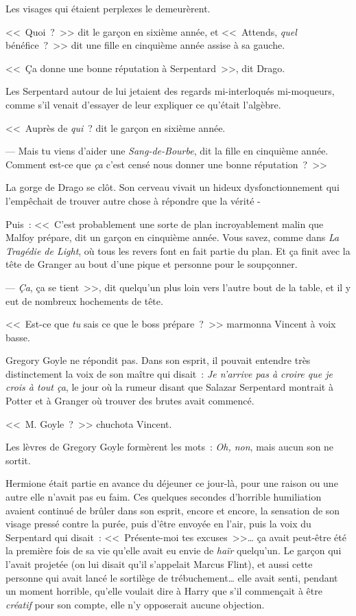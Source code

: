 Les visages qui étaient perplexes le demeurèrent.

<<~Quoi~?~>> dit le garçon en sixième année, et <<~Attends, \emph{quel} bénéfice~?~>> dit une fille en cinquième année assise à sa gauche.

<<~Ça donne une bonne réputation à Serpentard~>>, dit Drago.

Les Serpentard autour de lui jetaient des regards mi-interloqués mi-moqueurs, comme s'il venait d'essayer de leur expliquer ce qu'était l'algèbre.

<<~Auprès de \emph{qui}~? dit le garçon en sixième année.

--- Mais tu viens d'aider une \emph{Sang-de-Bourbe}, dit la fille en cinquième année. Comment est-ce que \emph{ça} c'est censé nous donner une bonne réputation~?~>>

La gorge de Drago se clôt. Son cerveau vivait un hideux dysfonctionnement qui l'empêchait de trouver autre chose à répondre que la vérité -

Puis~: <<~C'est probablement une sorte de plan incroyablement malin que Malfoy prépare, dit un garçon en cinquième année. Vous savez, comme dans \emph{La Tragédie de Light}, où tous les revers font en fait partie du plan. Et ça finit avec la tête de Granger au bout d'une pique et personne pour le soupçonner.

--- \emph{Ça}, ça se tient~>>, dit quelqu'un plus loin vers l'autre bout de la table, et il y eut de nombreux hochements de tête.

\later

<<~Est-ce que \emph{tu} sais ce que le boss prépare~?~>> marmonna Vincent à voix basse.

Gregory Goyle ne répondit pas. Dans son esprit, il pouvait entendre très distinctement la voix de son maître qui disait~: \emph{Je n'arrive pas à croire que je crois à tout ça}, le jour où la rumeur disant que Salazar Serpentard montrait à Potter et à Granger où trouver des brutes avait commencé.

<<~M. Goyle~?~>> chuchota Vincent.

Les lèvres de Gregory Goyle formèrent les mots~: \emph{Oh, non}, mais aucun son ne sortit.

\later

Hermione était partie en avance du déjeuner ce jour-là, pour une raison ou une autre elle n'avait pas eu faim. Ces quelques secondes d'horrible humiliation avaient continué de brûler dans son esprit, encore et encore, la sensation de son visage pressé contre la purée, puis d'être envoyée en l'air, puis la voix du Serpentard qui disait~: <<~Présente-moi tes excuses~>>… ça avait peut-être été la première fois de sa vie qu'elle avait eu envie de \emph{haïr} quelqu'un. Le garçon qui l'avait projetée (on lui disait qu'il s'appelait Marcus Flint), et aussi cette personne qui avait lancé le sortilège de trébuchement… elle avait senti, pendant un moment horrible, qu'elle voulait dire à Harry que s'il commençait à être \emph{créatif} pour son compte, elle n'y opposerait aucune objection.

